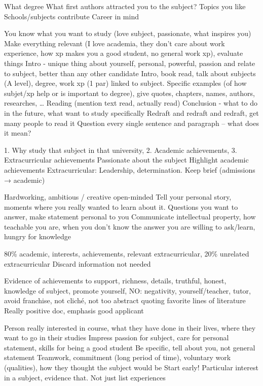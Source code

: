 \documentclass[11pt]{article}
\newcommand*{\NEWLINE}{\vspace{0.75em}}
\begin{document}
What degree
What first authors attracted you to the subject?
Topics you like
Schools/subjects contribute
Career in mind \NEWLINE{}

You know what you want to study (love subject, passionate, what inspires you) 
Make everything relevant (I love academia, they don’t care about work experience, how xp makes you a good student, no general work xp), evaluate things
Intro - unique thing about yourself, personal, powerful, passion and relate to subject, better than any other candidate
Intro, book read, talk about subjects (A level), degree, work xp (1 par) linked to subject.
Specific examples (of how subjet/xp help or is important to degree), give quotes, chapters, names, authors, researches, … 
Reading (mention text read, actually read)
Conclusion - what to do in the future, what want to study specifically
Redraft and redraft and redraft, get many people to read it
Question every single sentence and paragraph -- what does it mean?
\NEWLINE{}

1. Why study that subject in that university, 2. Academic achievements, 3. Extracurricular achievements
Passionate about the subject
Highlight academic achievements
Extracurricular: Leadership, determination. Keep brief (admissions → academic)
\NEWLINE{}

Hardworking, ambitious / creative open-minded
Tell your personal story, moments where you really wanted to learn about it. Questions you want to answer, make statement personal to you
Communicate intellectual property, how teachable you are, when you don’t know the answer you are willing to ask/learn, hungry for knowledge
\NEWLINE{}

80\% academic, interests, achievements, relevant extracurricular, 20\% unrelated extracurricular
Discard information not needed
\NEWLINE{}

Evidence of achievements to support, richness, details, truthful, honest, knowledge of subject, promote yourself, 
NO: negativity, yourself/teacher, tutor, avoid franchise, not cliché, not too abstract quoting favorite lines of literature
Really positive doc, emphasis good applicant
\NEWLINE{}

Person really interested in course, what they have done in their lives, where they want to go in their studies
Impress passion for subject, care for personal statement, skills for being a good student
Be specific, tell about you, not general statement
Teamwork, commitment (long period of time), voluntary work (qualities), how they thought the subject would be
Start early! Particular interest in a subject, evidence that. Not just list experiences
\NEWLINE{}
\end{document}
